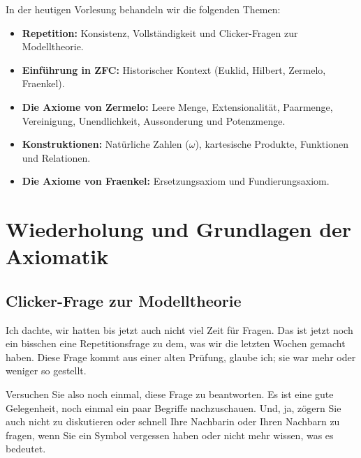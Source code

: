 


\begin{nice-box}
In der heutigen Vorlesung behandeln wir die folgenden Themen:
\begin{itemize}
    \item \textbf{Repetition:} Konsistenz, Vollständigkeit und Clicker-Fragen zur Modelltheorie.
    \item \textbf{Einführung in ZFC:} Historischer Kontext (Euklid, Hilbert, Zermelo, Fraenkel).
    \item \textbf{Die Axiome von Zermelo:} Leere Menge, Extensionalität, Paarmenge, Vereinigung, Unendlichkeit, Aussonderung und Potenzmenge.
    \item \textbf{Konstruktionen:} Natürliche Zahlen ($\omega$), kartesische Produkte, Funktionen und Relationen.
    \item \textbf{Die Axiome von Fraenkel:} Ersetzungsaxiom und Fundierungsaxiom.
\end{itemize}
\end{nice-box}

\section{Wiederholung und Grundlagen der Axiomatik}

\subsection{Clicker-Frage zur Modelltheorie}
\begin{spoken-clean}[00:00:00 - 00:01:21]
Ich dachte, wir hatten bis jetzt auch nicht viel Zeit für Fragen. Das ist jetzt noch ein bisschen eine Repetitionsfrage zu dem, was wir die letzten Wochen gemacht haben. Diese Frage kommt aus einer alten Prüfung, glaube ich; sie war mehr oder weniger so gestellt.

Versuchen Sie also noch einmal, diese Frage zu beantworten. Es ist eine gute Gelegenheit, noch einmal ein paar Begriffe nachzuschauen. Und, ja, zögern Sie auch nicht zu diskutieren oder schnell Ihre Nachbarin oder Ihren Nachbarn zu fragen, wenn Sie ein Symbol vergessen haben oder nicht mehr wissen, was es bedeutet.
\end{spoken-clean}


